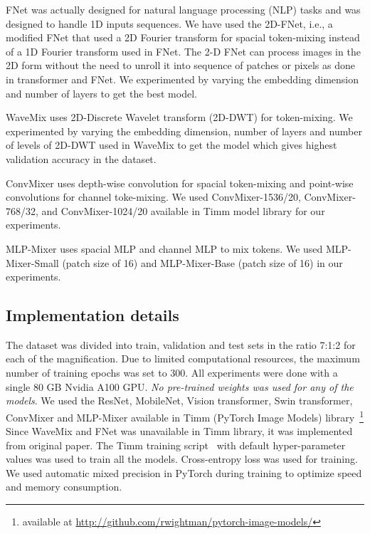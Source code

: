 \documentclass[nohyperref]{article}
\theoremstyle{plain}
\theoremstyle{definition}
\theoremstyle{remark}
\begin{document}
FNet \cite{lee2021fnet} was actually designed for natural language processing (NLP) tasks and was designed to handle 1D inputs sequences. We have used the 2D-FNet, i.e., a modified FNet that used a 2D Fourier transform for spacial token-mixing instead of a 1D Fourier transform used in FNet. The 2-D FNet can process images in the 2D form without the need to unroll it into sequence of patches or pixels as done in transformer and FNet. We experimented by varying the embedding dimension and number of layers to get the best model.

WaveMix \cite{https://doi.org/10.48550/arxiv.2205.14375} uses 2D-Discrete Wavelet transform (2D-DWT) for token-mixing. We experimented by varying the embedding dimension, number of layers and number of levels of 2D-DWT used in WaveMix to get the model which gives highest validation accuracy in the dataset. 

ConvMixer \cite{trockman2022patches} uses depth-wise convolution for spacial token-mixing and point-wise convolutions for channel toke-mixing. We used ConvMixer-1536/20, ConvMixer-768/32, and ConvMixer-1024/20 available in Timm model library for our experiments. 

MLP-Mixer \cite{tolstikhin2021mlp} uses spacial MLP and channel MLP to mix tokens. We used MLP-Mixer-Small (patch size of 16) and MLP-Mixer-Base (patch size of 16) in our experiments. 






\subsection{Implementation details}

The dataset was divided into train, validation and test sets in the ratio 7:1:2 for each of the magnification. Due to limited computational resources, the maximum number of training epochs was set to 300. All experiments were done with a single 80 GB Nvidia A100 GPU. \emph{No pre-trained weights was used for any of the models}. We used the ResNet, MobileNet, Vision transformer, Swin transformer, ConvMixer and MLP-Mixer available in Timm (PyTorch Image Models) library~\cite{rw2019timm}\footnote{available at \url{http://github.com/rwightman/pytorch-image-models/}} Since WaveMix and FNet  was unavailable in Timm library, it was implemented from original paper. The Timm training script~\cite{rw2019timm} with default hyper-parameter values was used to train all the models. Cross-entropy loss was used for training. We used automatic mixed precision in PyTorch during training to optimize speed and memory consumption. 
\end{document}
